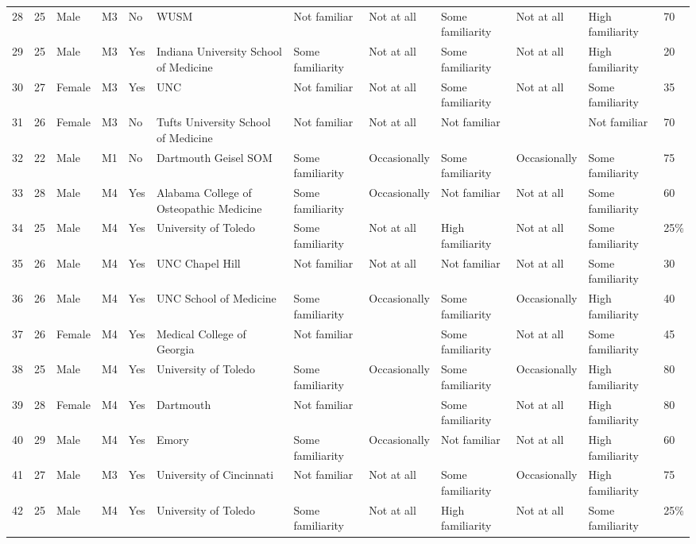 \documentclass[11pt]{article}
\begin{document}
\begin{landscape}
{\begin{longtable}{rlllllllllll}
28 & 25 & Male & M3 & No & WUSM & Not familiar & Not at all & Some familiarity & Not at all & High familiarity & 70 \\
29 & 25 & Male & M3 & Yes & Indiana University School of Medicine & Some familiarity & Not at all & Some familiarity & Not at all & High familiarity & 20 \\
30 & 27 & Female & M3 & Yes & UNC & Not familiar & Not at all & Some familiarity & Not at all & Some familiarity & 35 \\
31 & 26 & Female & M3 & No & Tufts University School of Medicine & Not familiar & Not at all & Not familiar &  & Not familiar & 70 \\
32 & 22 & Male & M1 & No & Dartmouth Geisel SOM & Some familiarity & Occasionally & Some familiarity & Occasionally & Some familiarity & 75 \\
33 & 28 & Male & M4 & Yes & Alabama College of Osteopathic Medicine & Some familiarity & Occasionally & Not familiar & Not at all & Some familiarity & 60 \\
34 & 25 & Male & M4 & Yes & University of Toledo & Some familiarity & Not at all & High familiarity & Not at all & Some familiarity & 25\% \\
35 & 26 & Male & M4 & Yes & UNC Chapel Hill & Not familiar & Not at all & Not familiar & Not at all & Some familiarity & 30 \\
36 & 26 & Male & M4 & Yes & UNC School of Medicine & Some familiarity & Occasionally & Some familiarity & Occasionally & High familiarity & 40 \\
37 & 26 & Female & M4 & Yes & Medical College of Georgia & Not familiar &  & Some familiarity & Not at all & Some familiarity & 45 \\
38 & 25 & Male & M4 & Yes & University of Toledo & Some familiarity & Occasionally & Some familiarity & Occasionally & High familiarity & 80 \\
39 & 28 & Female & M4 & Yes & Dartmouth & Not familiar &  & Some familiarity & Not at all & High familiarity & 80 \\
40 & 29 & Male & M4 & Yes & Emory & Some familiarity & Occasionally & Not familiar & Not at all & High familiarity & 60 \\
41 & 27 & Male & M3 & Yes & University of Cincinnati & Not familiar & Not at all & Some familiarity & Occasionally & High familiarity & 75 \\
42 & 25 & Male & M4 & Yes & University of Toledo & Some familiarity & Not at all & High familiarity & Not at all & Some familiarity & 25\% \\

\end{longtable}}
\end{landscape}
\end{document}
